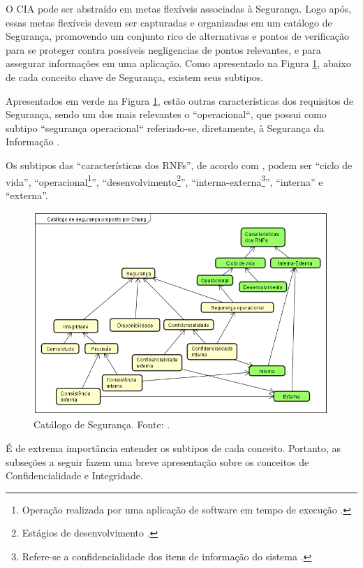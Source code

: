 O CIA pode ser abstraído em metas flexíveis associadas à Segurança. Logo após, essas metas flexíveis devem ser capturadas e organizadas em um catálogo de Segurança, promovendo um conjunto rico de alternativas e pontos de verificação para se proteger contra possíveis negligencias de pontos relevantes, e para assegurar informações em uma aplicação. Como apresentado na Figura \ref{catalogoSegurancaChung}, abaixo de cada conceito chave de Segurança, existem seus subtipos. 

Apresentados em  verde na Figura \ref{catalogoSegurancaChung}, estão outras características dos requisitos de Segurança, sendo um dos mais relevantes o ``operacional``, que possui como subtipo ``segurança operacional`` referindo-se, diretamente, à Segurança da Informação \cite{chung2012non}.


Os subtipos das “características dos RNFs”, de acordo com \cite{chung2012non}, podem ser “ciclo de vida”, “operacional\footnote[1]{Operação realizada por uma aplicação de software em tempo de execução \cite{chung2012non}.}”, “desenvolvimento\footnote[2]{Estágios de desenvolvimento \cite{chung2012non}.}”, “interna-externa\footnote[3]{Refere-se a confidencialidade dos itens de informação do sistema \cite{chung2012non}.}”, “interna” e “externa”.

\begin{figure}[h!]
	\centering
	\includegraphics[keepaspectratio=true,scale=0.9]{figuras/catalogoSegurancaChung.PNG}
	\caption{Catálogo de Segurança. Fonte: \cite{chung2012non}.}
	\label{catalogoSegurancaChung}
\end{figure}

É de extrema importância entender os subtipos de cada conceito. Portanto, as subseções a seguir fazem uma breve apresentação sobre os conceitos de Confidencialidade e Integridade. 

